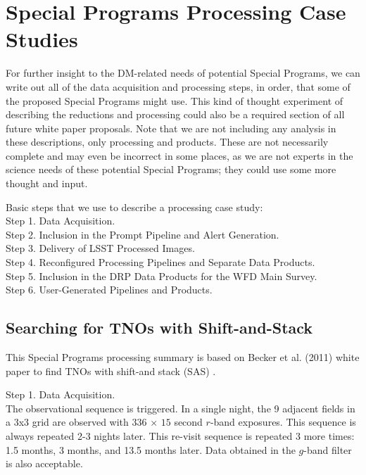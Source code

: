 \documentclass[DM,lsstdoc,toc]{lsstdoc}
\begin{document}
\clearpage
\section{Special Programs Processing Case Studies}\label{sec:SPCS}

For further insight to the DM-related needs of potential Special Programs, we can write out all of the data acquisition and processing steps, in order, that some of the proposed Special Programs might use. This kind of thought experiment of describing the reductions and processing could also be a required section of all future white paper proposals. Note that we are not including any analysis in these descriptions, only processing and products. These are not necessarily complete and may even be incorrect in some places, as we are not experts in the science needs of these potential Special Programs; they could use some more thought and input.

Basic steps that we use to describe a processing case study: \\
Step 1. Data Acquisition. \\
Step 2. Inclusion in the Prompt Pipeline and Alert Generation. \\
Step 3. Delivery of LSST Processed Images. \\
Step 4. Reconfigured Processing Pipelines and Separate Data Products. \\
Step 5. Inclusion in the DRP Data Products for the WFD Main Survey. \\
Step 6. User-Generated Pipelines and Products. \\


\subsection{Searching for TNOs with Shift-and-Stack}\label{ssec:SPCS_TNO}

This Special Programs processing summary is based on Becker et al. (2011) white paper to find TNOs with shift-and stack (SAS) .

Step 1. Data Acquisition. \\
The observational sequence is triggered. In a single night, the 9 adjacent fields in a 3x3 grid are observed with $336$ $\times$ $15$ second $r$-band exposures. This sequence is always repeated 2-3 nights later. This re-visit sequence is repeated 3 more times: 1.5 months, 3 months, and 13.5 months later. Data obtained in the $g$-band filter is also acceptable. 
\end{document}
